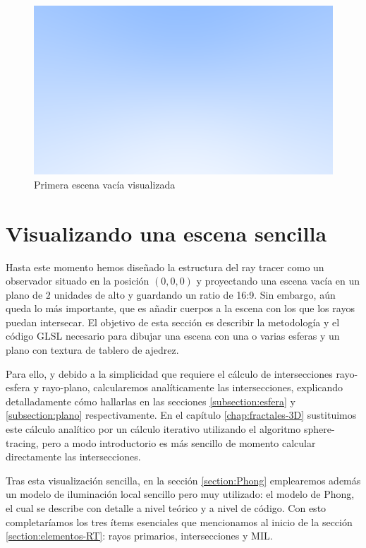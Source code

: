 \begin{figure} [ht]
    \centering
    \includegraphics[scale = 0.35]{img/C8/first-render.png}
    \caption{Primera escena vacía visualizada}
    \label{fig:first-render}
\end{figure}

\section{Visualizando una escena sencilla}
\label{section:escena}

Hasta este momento hemos diseñado la estructura del ray tracer como un observador situado en la posición $(0, 0,0)$ y proyectando una escena vacía en un plano de $2$ unidades de alto y guardando un ratio de 16:9. Sin embargo, aún queda lo más importante, que es añadir cuerpos a la escena con los que los rayos puedan intersecar. El objetivo de esta sección es describir la metodología y el código GLSL necesario para dibujar una escena con una o varias esferas y un plano con textura de tablero de ajedrez. 

Para ello, y debido a la simplicidad que requiere el cálculo de intersecciones rayo-esfera y rayo-plano, calcularemos analíticamente las intersecciones, explicando detalladamente cómo hallarlas en las secciones \ref{subsection:esfera} y \ref{subsection:plano} respectivamente. En el capítulo \ref{chap:fractales-3D} sustituimos este cálculo analítico por un cálculo iterativo utilizando el algoritmo sphere-tracing, pero a modo introductorio es más sencillo de momento calcular directamente las intersecciones.

Tras esta visualización sencilla, en la sección \ref{section:Phong} emplearemos además un modelo de iluminación local sencillo pero muy utilizado: el modelo de Phong, el cual se describe con detalle a nivel teórico y a nivel de código. Con esto completaríamos los tres ítems esenciales que mencionamos al inicio de la sección \ref{section:elementos-RT}: rayos primarios, intersecciones y MIL.

